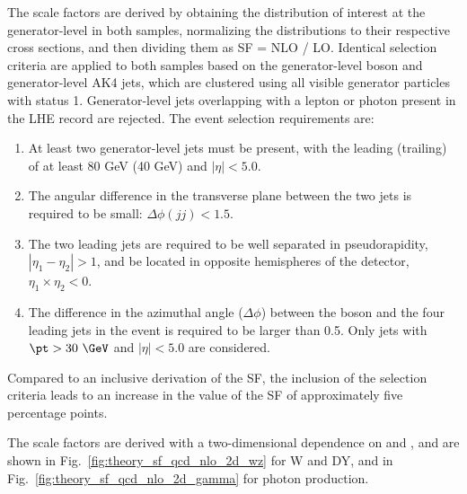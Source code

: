 The scale factors are derived by obtaining the distribution of interest at the generator-level in both samples, normalizing the distributions to their respective cross sections, and then dividing them as SF = NLO / LO. Identical selection criteria are applied to both samples based on the generator-level boson and generator-level AK4 jets, which are clustered using all visible generator particles with status 1. Generator-level jets overlapping with a lepton or photon present in the LHE record are rejected. The event selection requirements are:

\begin{enumerate}
\item At least two generator-level jets must be present, with the leading (trailing) \pt of at least 80 GeV (40 GeV) and $|\eta|<5.0$.
\item The angular difference in the transverse plane between the two jets is required to be small: $\Delta\phi(jj) < 1.5$.
\item The two leading jets are required to be well separated in pseudorapidity, $|\eta_{1}-\eta_{2}| > 1$, and be located in opposite hemispheres of the detector, $\eta_{1}\times \eta_{2}<0$.
\item The difference in the azimuthal angle ($\Delta\phi$) between the boson and the four leading jets in the event is required to be larger than 0.5. Only jets with $\pt>30~\GeV$ and $|\eta|<5.0$ are considered.
\end{enumerate}

Compared to an inclusive derivation of the SF, the inclusion of the selection criteria leads to an increase in the value of the SF of approximately five percentage points.


The scale factors are derived with a two-dimensional dependence on \ptv and \mjj, and are shown in Fig.~\ref{fig:theory_sf_qcd_nlo_2d_wz} for W and DY, and in Fig.~\ref{fig:theory_sf_qcd_nlo_2d_gamma} for photon production.

